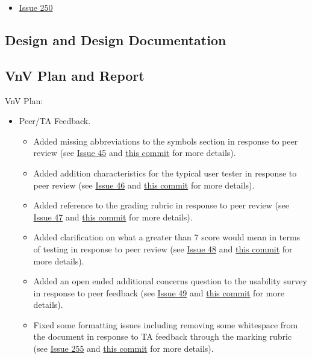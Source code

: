 \documentclass{article}
\begin{document}
\begin{itemize}
    \item \href{https://github.com/davimang/REACH/issues/250}{Issue 250}
\end{itemize}


\subsection{Design and Design Documentation}

\subsection{VnV Plan and Report}

VnV Plan:
\begin{itemize}
	\item Peer/TA Feedback.
	\begin{itemize}
		\item Added missing abbreviations to the symbols section in response to peer review (see \href{https://github.com/davimang/REACH/issues/45}{Issue 45} and \href{https://github.com/davimang/REACH/commit/ed1e1b779a09e4f9307eda85c31f5c630c82901a}{this commit} for more details).
		\item Added addition characteristics for the typical user tester in response to peer review (see \href{https://github.com/davimang/REACH/issues/46}{Issue 46} and \href{https://github.com/davimang/REACH/commit/fddfee5364754dc5f378b798aa95c6b2c8936416}{this commit} for more details).
		\item Added reference to the grading rubric in response to peer review (see \href{https://github.com/davimang/REACH/issues/47}{Issue 47} and \href{https://github.com/davimang/REACH/commit/88505588e5dba20dca6da5269ea3a9d1a4790b0b}{this commit} for more details).
		\item Added clarification on what a greater than 7 score would mean in terms of testing in response to peer review (see \href{https://github.com/davimang/REACH/issues/48}{Issue 48} and \href{https://github.com/davimang/REACH/commit/b0e38a2fd6e89f05ef0aa6bf5e46b53227dce24f}{this commit} for more details).
		\item Added an open ended additional concerns question to the usability survey in response to peer feedback (see \href{https://github.com/davimang/REACH/issues/49}{Issue 49} and \href{https://github.com/davimang/REACH/commit/10b7cbf6ab0c7e78344dd1dff75ae76adf6cd4c2}{this commit} for more details).
		\item Fixed some formatting issues including removing some whitespace from the document in response to TA feedback through the marking rubric (see \href{https://github.com/davimang/REACH/issues/255}{Issue 255} and \href{https://github.com/davimang/REACH/commit/ad4b67e9f87e89c4d2c1a409db14da7401b8f39c}{this commit} for more details).

\end{itemize}
\end{itemize}
\end{document}
